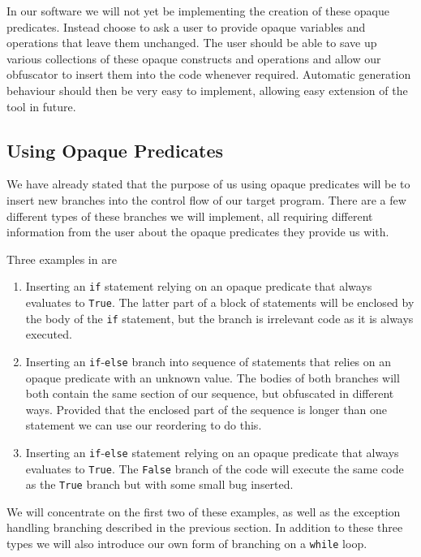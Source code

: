 \documentclass[twoside,a4paper]{report}
\begin{document}
In our software we will not yet be implementing the creation of these opaque predicates. Instead choose to ask a user to provide opaque variables and operations that
leave them unchanged. The user should be able to save up various collections of these opaque constructs and operations and allow our obfuscator to insert them
into the code whenever required. Automatic generation behaviour should then be very easy to implement, allowing easy extension of the tool in future.

\subsection{Using Opaque Predicates}

We have already stated that the purpose of us using opaque predicates will be to insert new branches into the control flow of our target program. There are a
few different types of these branches we will implement, all requiring different information from the user about the opaque predicates they provide us with.

Three examples in \cite{taxobftrans} are

\begin{enumerate}
\item Inserting an \texttt{if} statement relying on an opaque predicate that always evaluates to \texttt{True}. The latter part of a block of statements will
      be enclosed by the body of the \texttt{if} statement, but the branch is irrelevant code as it is always executed.
\item Inserting an \texttt{if}-\texttt{else} branch into sequence of statements that relies on an opaque predicate with an unknown value. The bodies of both
      branches will both contain the same section of our sequence, but obfuscated in different ways. Provided that the enclosed part of the sequence is longer
      than one statement we can use our reordering to do this.
\item Inserting an \texttt{if}-\texttt{else} statement relying on an opaque predicate that always evaluates to \texttt{True}. The \texttt{False} branch of the
      code will execute the same code as the \texttt{True} branch but with some small bug inserted.
\end{enumerate}

We will concentrate on the first two of these examples, as well as the exception handling branching described in the previous section. In addition to these
three types we will also introduce our own form of branching on a \texttt{while} loop.
\end{document}

